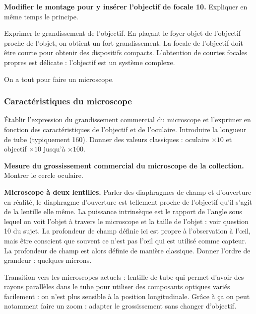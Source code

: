 \begin{experience}
\textbf{Modifier le montage pour y insérer l'objectif de focale \unit{10}{\centi\meter}.}
Expliquer en même temps le principe.
\end{experience}

Exprimer le grandissement de l'objectif.
En plaçant le foyer objet de l'objectif proche de l'objet, on obtient un fort grandissement.
La focale de l'objectif doit être courte pour obtenir des dispositifs compacts.
L'obtention de courtes focales propres est délicate : l'objectif est un système complexe.

\begin{transition}
On a tout pour faire un microscope.
\end{transition}

\subsubsection{Caractéristiques du microscope}

Établir l'expression du grandissement commercial du microscope et l'exprimer en fonction des caractéristiques de l'objectif et de l'oculaire.
Introduire la longueur de tube (typiquement \unit{160}{\milli\meter}).
Donner des valeurs classiques : oculaire $\times 10$ et objectif $\times 10$ jusqu'à $\times 100$.

\begin{experience}
\textbf{Mesure du grossissement commercial du microscope de la collection.}
Montrer le cercle oculaire.
\end{experience}

\begin{slide}
\textbf{Microscope à deux lentilles.}
Parler des diaphragmes de champ et d'ouverture en réalité, le diaphragme d'ouverture est tellement proche de l'objectif qu'il s'agit de la lentille elle même.
La puissance intrinsèque est le rapport de l'angle sous lequel on voit l'objet à travers le microscope et la taille de l'objet : voir question 10 du sujet.
La profondeur de champ définie ici est propre à l'observation à l'œil, mais être conscient que souvent ce n'est pas l'œil qui est utilisé comme capteur.
La profondeur de champ est alors définie de manière classique.
Donner l'ordre de grandeur : quelques microns.
\end{slide}

\begin{remarque}
Transition vers les microscopes actuels : lentille de tube qui permet d'avoir des rayons parallèles dans le tube pour utiliser des composants optiques variés facilement : on n'est plus sensible à la position longitudinale.
Grâce à ça on peut notamment faire un zoom : adapter le grossissement sans changer d'objectif.
\end{remarque}

